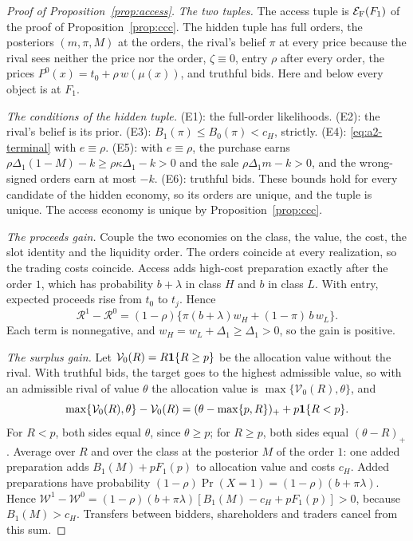 \begin{proof}[Proof of Proposition~\ref{prop:access}]
\emph{The two tuples.} The access tuple is \(\mathcal E_{\rm F}(F_1)\) of the proof of Proposition~\ref{prop:ccc}. The hidden
tuple has full orders, the posteriors \((m,\pi,M)\) at the orders, the rival's belief \(\pi\) at every price
because the rival sees neither the price nor the order, \(\zeta\equiv0\), entry \(\rho\) after every order, the
prices \(P^0(x)=t_0+\rho\,w(\mu(x))\), and truthful bids. Here and below every object is at \(F_1\).

\emph{The conditions of the hidden tuple.} (E1): the full-order likelihoods. (E2): the rival's belief is its
prior. (E3): \(B_1(\pi)\le B_0(\pi)<c_H\), strictly. (E4): \eqref{eq:a2-terminal} with \(e\equiv\rho\). (E5): with
\(e\equiv\rho\), the purchase earns \(\rho\Delta_1(1-M)-k\ge\rho\kappa\Delta_1-k>0\) and the sale
\(\rho\Delta_1m-k>0\), and the wrong-signed orders earn at most \(-k\). (E6): truthful bids. These bounds hold for
every candidate of the hidden economy, so its orders are unique, and the tuple is unique. The access economy is
unique by Proposition~\ref{prop:ccc}.

\emph{The proceeds gain.} Couple the two economies on the class, the value, the cost, the slot identity and the
liquidity order. The orders coincide at every realization, so the trading costs coincide. Access adds high-cost
preparation exactly after the order \(1\), which has probability \(b+\lambda\) in class \(H\) and \(b\) in class
\(L\). With entry, expected proceeds rise from \(t_0\) to \(t_j\). Hence
\[
\mathcal R^1-\mathcal R^0=(1-\rho)\{\pi(b+\lambda)w_H+(1-\pi)\,b\,w_L\}.
\]
Each term is nonnegative, and \(w_H=w_L+\Delta_1\ge\Delta_1>0\), so the gain is positive.

\emph{The surplus gain.} Let \(\mathcal V_0(R)=R\mathbf{1}\{R\ge p\}\) be the allocation value without the rival.
With truthful bids, the target goes to the highest admissible value, so with an admissible rival of value
\(\theta\) the allocation value is \(\max\{\mathcal V_0(R),\theta\}\), and
\begin{equation}\label{eq:a7-welfare}
\max\{\mathcal V_0(R),\theta\}-\mathcal V_0(R)=(\theta-\max\{p,R\})_++p\mathbf{1}\{R<p\}.
\end{equation}
For \(R<p\), both sides equal \(\theta\), since \(\theta\ge p\); for \(R\ge p\), both sides equal \((\theta-R)_+\).
Average over \(R\) and over the class at the posterior \(M\) of the order \(1\): one added preparation adds
\(B_1(M)+pF_1(p)\) to allocation value and costs \(c_H\). Added preparations have probability
\((1-\rho)\Pr(X=1)=(1-\rho)(b+\pi\lambda)\). Hence
\(\mathcal W^1-\mathcal W^0=(1-\rho)(b+\pi\lambda)[B_1(M)-c_H+pF_1(p)]>0\), because \(B_1(M)>c_H\). Transfers between
bidders, shareholders and traders cancel from this sum.
\end{proof}

